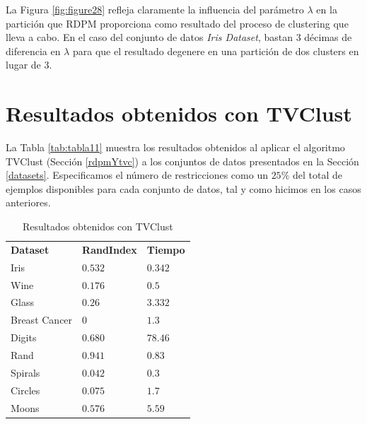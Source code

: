 La Figura \ref{fig:figure28} refleja claramente la influencia del parámetro $\lambda$ en la partición que \acs{RDPM} proporciona como resultado del proceso de clustering que lleva a cabo. En el caso del conjunto de datos \textit{Iris Dataset}, bastan 3 décimas de diferencia en $\lambda$ para que el resultado degenere en una partición de dos clusters en lugar de 3.

\clearpage

\section{Resultados obtenidos con TVClust}

La Tabla \ref{tab:tabla11} muestra los resultados obtenidos al aplicar el algoritmo \acf{TVClust} (Sección \ref{rdpmYtvc}) a los conjuntos de datos presentados en la Sección \ref{datasets}. Especificamos el número de restricciones como un $25\%$ del total de ejemplos disponibles para cada conjunto de datos, tal y como hicimos en los casos anteriores.

\begin{table}[!h]
	\centering
	\setlength{\arrayrulewidth}{1mm}
	\setlength{\tabcolsep}{10pt}
	\renewcommand{\arraystretch}{0.9}
	
	\begin{tabular}{ >{\centering\arraybackslash}m{2.5cm}  >{\centering\arraybackslash}m{1.8cm}>{\centering\arraybackslash}m{1.5cm}}
		\hline
		\rowcolor{black}
		\multicolumn{3}{c}{\bf \color{white}{Resultados obtenidos con TVClust}}\\
		\hline
		\rowcolor{gray!50}
		\textbf{Dataset} & \textbf{RandIndex} & \textbf{Tiempo}  \\
		Iris & $0.532$ & $0.342$  \\
		Wine & $0.176$ & $0.5$  \\
		Glass & $0.26$ & $3.332$  \\
		Breast Cancer & $0$ & $1.3$  \\
		Digits & $0.680$ & $78.46$  \\
		Rand & $0.941$ & $0.83$  \\
		Spirals & $0.042$ & $0.3$  \\
		Circles & $0.075$ & $1.7$  \\
		Moons & $0.576$ & $5.59$  \\
		\hline
		
	\end{tabular}
	\caption{Resultados obtenidos con \acs{TVClust}}
	\label{tab:tabla12}
\end{table}

